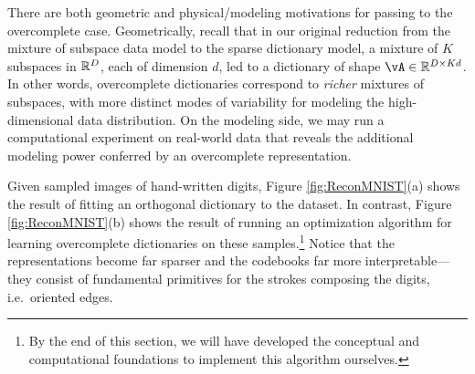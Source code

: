 \documentclass[\toplevelprefix/book-main.tex]{subfiles}
\begin{document}
There are both geometric and physical/modeling motivations for passing to the overcomplete case. 
Geometrically, recall that in our original reduction from the mixture of subspace data model to the sparse dictionary model, a mixture of $K$ subspaces in $\mathbb{R}^D$, each of dimension $d$, led to a dictionary of shape $\vA \in \R^{D \times Kd}$.
In other words, overcomplete dictionaries correspond to \textit{richer} mixtures of subspaces, with more distinct modes of variability for modeling the high-dimensional data distribution.
On the modeling side, we may run a computational experiment on real-world data that reveals the additional modeling power conferred by an overcomplete representation.
\begin{example}
Given sampled images of hand-written digits, Figure \ref{fig:ReconMNIST}(a) shows the result of fitting an orthogonal dictionary to the dataset. 
In contrast, Figure \ref{fig:ReconMNIST}(b) shows the result of running an
    optimization algorithm for learning overcomplete dictionaries on these samples.\footnote{By the end of this section, we will have developed the conceptual and computational foundations to implement this algorithm ourselves.} 
Notice that the representations become far sparser and the codebooks far more interpretable---they consist of fundamental primitives for the strokes composing the digits, i.e.\ oriented edges.
\end{example}
\end{document}
